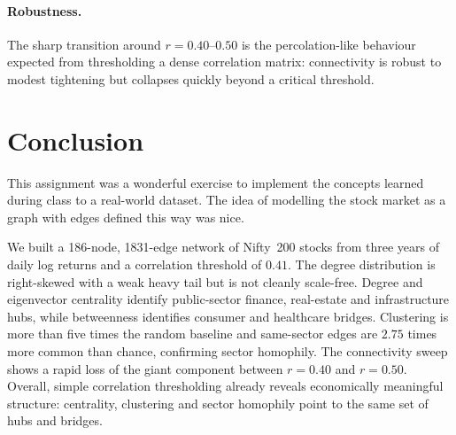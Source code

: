 \documentclass[11pt,a4paper]{article}
\begin{document}
\paragraph{Robustness.}
The sharp transition around $r=0.40$--$0.50$ is the percolation-like behaviour
expected from thresholding a dense correlation matrix: connectivity is robust
to modest tightening but collapses quickly beyond a critical threshold.

\section{Conclusion}
\label{sec:conclusion}
This assignment was a wonderful exercise to implement the concepts learned during class to a real-world dataset. The idea of modelling the stock market as a graph with edges defined this way was nice.

We built a 186-node, 1831-edge network of Nifty~200 stocks from three years of
daily log returns and a correlation threshold of $0.41$. The degree
distribution is right-skewed with a weak heavy tail but is not cleanly
scale-free. Degree and eigenvector centrality identify public-sector finance,
real-estate and infrastructure hubs, while betweenness identifies consumer and
healthcare bridges.
Clustering is more than five times the random baseline and same-sector edges
are $2.75$ times more common than chance, confirming sector homophily. The
connectivity sweep shows a rapid loss of the giant component between $r=0.40$
and $r=0.50$. Overall, simple correlation thresholding already reveals
economically meaningful structure: centrality, clustering and sector
homophily point to the same set of hubs and bridges.
\end{document}
